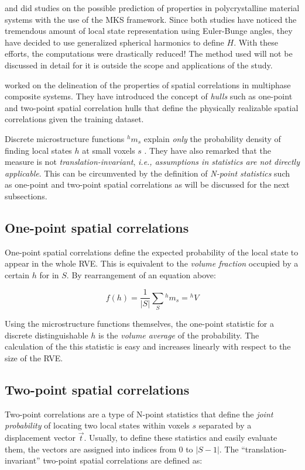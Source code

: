  and  did studies on the possible prediction of properties in polycrystalline material systems with the use of the MKS framework.
Since both studies have noticed the tremendous amount of local state representation using Euler-Bunge angles, they have decided to use generalized spherical harmonics to define $H$.
With these efforts, the computations were drastically reduced!
The method used will not be discussed in detail for it is outside the scope and applications of the study.

 worked on the delineation of the properties of spatial correlations in multiphase composite systems.
They have introduced the concept of \emph{hulls} such as one-point and two-point spatial correlation hulls that define the physically realizable spatial correlations given the training dataset.

Discrete microstructure functions $^hm_s$ explain \emph{only} the probability density of finding local states $h$ at small voxels $s$ \cite{polar}.
They have also remarked that the measure is not \textit{translation-invariant}, \textit{i.e., assumptions in statistics are not directly applicable}.
This can be circumvented by the definition of \emph{N-point statistics} such as one-point and two-point spatial correlations as will be discussed for the next subsections.

\subsection{One-point spatial correlations}

One-point spatial correlations define the expected probability of the local state to appear in the whole RVE.
This is equivalent to the \emph{volume fraction} occupied by a certain $h$ for in $S$.
By rearrangement of an equation above:

\[
  f(h) = \dfrac{1}{\lvert S\rvert} \sum_{S} {^hm_s} = {^hV}
\]

Using the microstructure functions themselves, the one-point statistic for a discrete distinguishable $h$ is the \emph{volume average} of the probability.
The calculation of the this statistic is easy and increases linearly with respect to the size of the RVE.

\subsection{Two-point spatial correlations}

Two-point correlations are a type of N-point statistics that define the \emph{joint probability} of locating two local states within voxels $s$ separated by a displacement vector $\vec{t}$.
Usually, to define these statistics and easily evaluate them, the vectors are assigned into indices from $0$ to $\lvert S-1\rvert$.
The ``translation-invariant'' two-point spatial correlations are defined as:

